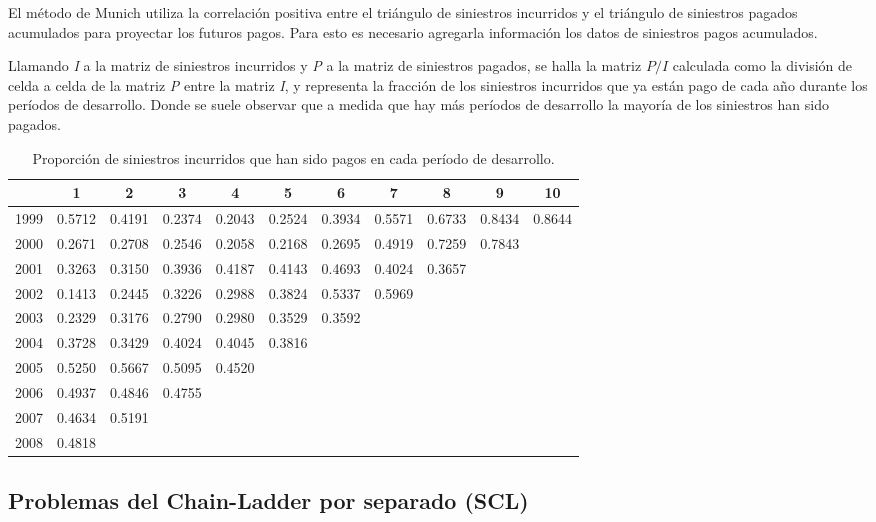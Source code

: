 \documentclass[
  12pt,
]{article}
\begin{document}
El método de Munich utiliza la correlación positiva entre el triángulo
de siniestros incurridos y el triángulo de siniestros pagados acumulados
para proyectar los futuros pagos. Para esto es necesario agregarla
información los datos de siniestros pagos acumulados.

Llamando \emph{I} a la matriz de siniestros incurridos y \emph{P} a la
matriz de siniestros pagados, se halla la matriz \(P/I\) calculada como
la división de celda a celda de la matriz \emph{P} entre la matriz
\emph{I}, y representa la fracción de los siniestros incurridos que ya
están pago de cada año durante los períodos de desarrollo. Donde se
suele observar que a medida que hay más períodos de desarrollo la
mayoría de los siniestros han sido pagados.

\begin{table}[ht]
\centering
\begingroup\fontsize{8.5pt}{10pt}\selectfont
\begin{tabular}{ccccccccccc}
  \hline
 & 1 & 2 & 3 & 4 & 5 & 6 & 7 & 8 & 9 & 10 \\ 
  \hline
1999 & 0.5712 & 0.4191 & 0.2374 & 0.2043 & 0.2524 & 0.3934 & 0.5571 & 0.6733 & 0.8434 & 0.8644 \\ 
  2000 & 0.2671 & 0.2708 & 0.2546 & 0.2058 & 0.2168 & 0.2695 & 0.4919 & 0.7259 & 0.7843 &  \\ 
  2001 & 0.3263 & 0.3150 & 0.3936 & 0.4187 & 0.4143 & 0.4693 & 0.4024 & 0.3657 &  &  \\ 
  2002 & 0.1413 & 0.2445 & 0.3226 & 0.2988 & 0.3824 & 0.5337 & 0.5969 &  &  &  \\ 
  2003 & 0.2329 & 0.3176 & 0.2790 & 0.2980 & 0.3529 & 0.3592 &  &  &  &  \\ 
  2004 & 0.3728 & 0.3429 & 0.4024 & 0.4045 & 0.3816 &  &  &  &  &  \\ 
  2005 & 0.5250 & 0.5667 & 0.5095 & 0.4520 &  &  &  &  &  &  \\ 
  2006 & 0.4937 & 0.4846 & 0.4755 &  &  &  &  &  &  &  \\ 
  2007 & 0.4634 & 0.5191 &  &  &  &  &  &  &  &  \\ 
  2008 & 0.4818 &  &  &  &  &  &  &  &  &  \\ 
   \hline
\end{tabular}
\endgroup
\caption{Proporción de siniestros incurridos que han sido pagos en cada período de desarrollo.} 
\label{tabla2}
\end{table}

\hypertarget{problemas-del-chain-ladder-por-separado-scl}{%
\subsection{Problemas del Chain-Ladder por separado
(SCL)}\label{problemas-del-chain-ladder-por-separado-scl}}
\end{document}
